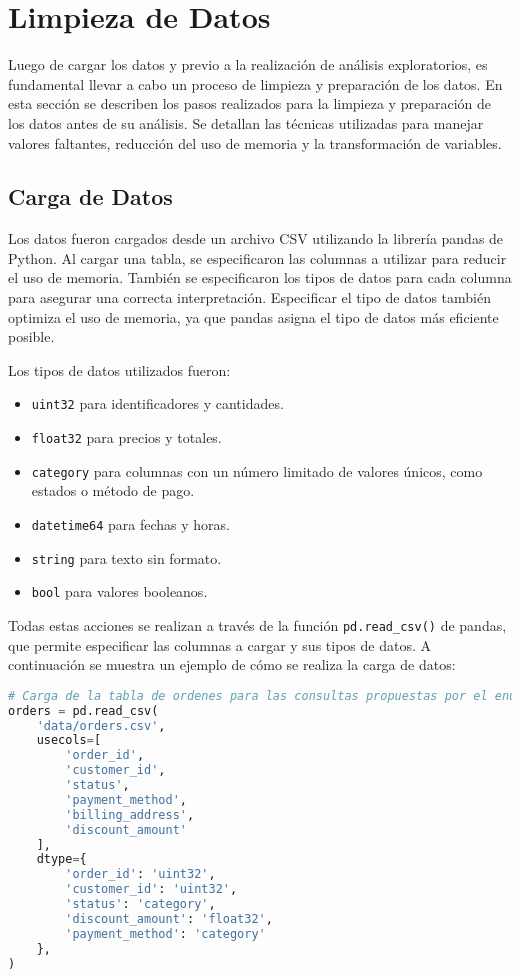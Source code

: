 \section{Limpieza de Datos}
\label{sec:limpieza_de_datos}

Luego de cargar los datos y previo a la realización de análisis exploratorios, es fundamental llevar a cabo un proceso de limpieza y preparación de los datos.
En esta sección se describen los pasos realizados para la limpieza y preparación de los datos antes de su análisis. Se detallan las técnicas utilizadas para manejar valores faltantes, reducción del uso de memoria y la transformación de variables.

\subsection{Carga de Datos}

Los datos fueron cargados desde un archivo CSV utilizando la librería pandas de Python. Al cargar una tabla, se especificaron las columnas a utilizar para reducir el uso de memoria. También se especificaron los tipos de datos para cada columna para asegurar una correcta interpretación. Especificar el tipo de datos también optimiza el uso de memoria, ya que pandas asigna el tipo de datos más eficiente posible.

Los tipos de datos utilizados fueron:
\begin{itemize}
    \item \texttt{uint32} para identificadores y cantidades.
    \item \texttt{float32} para precios y totales.
    \item \texttt{category} para columnas con un número limitado de valores únicos, como estados o método de pago.
    \item \texttt{datetime64} para fechas y horas.
    \item \texttt{string} para texto sin formato.
    \item \texttt{bool} para valores booleanos.
\end{itemize}

Todas estas acciones se realizan a través de la función \texttt{pd.read\_csv()} de pandas, que permite especificar las columnas a cargar y sus tipos de datos. A continuación se muestra un ejemplo de cómo se realiza la carga de datos:

\begin{lstlisting}[language=Python, xleftmargin=70pt, xrightmargin=70pt]
# Carga de la tabla de ordenes para las consultas propuestas por el enunciado
orders = pd.read_csv(
    'data/orders.csv',
    usecols=[
        'order_id',
        'customer_id',
        'status',
        'payment_method',
        'billing_address',
        'discount_amount'
    ],
    dtype={
        'order_id': 'uint32',
        'customer_id': 'uint32',
        'status': 'category',
        'discount_amount': 'float32',
        'payment_method': 'category'
    },
)
\end{lstlisting}

